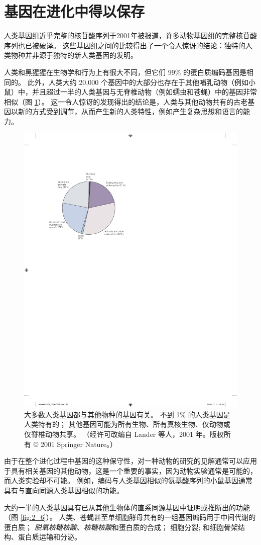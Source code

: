 \section{基因在进化中得以保存}

人类基因组近乎完整的核苷酸序列于2001年被报道，许多动物基因组的完整核苷酸序列也已被破译。 
这些基因组之间的比较得出了一个令人惊讶的结论：独特的人类物种并非源于独特的新人类基因的发明。


人类和黑猩猩在生物学和行为上有很大不同，但它们 99\% 的蛋白质编码基因是相同的。 
此外，人类大约 20,000 个基因中的大部分也存在于其他哺乳动物（例如小鼠）中，并且超过一半的人类基因与无脊椎动物（例如蠕虫和苍蝇）中的基因非常相似（图 \ref{fig:2_5}）。 
这一令人惊讶的发现得出的结论是，人类与其他动物共有的古老基因以新的方式受到调节，从而产生新的人类特性，例如产生复杂思想和语言的能力。

\begin{figure}[htbp]
	\centering
	\includegraphics[width=0.5\linewidth]{chap02/fig_2_5}
	\caption{大多数人类基因都与其他物种的基因有关。
		不到 1\% 的人类基因是人类特有的； 其他基因可能为所有生物、所有真核生物、仅动物或仅脊椎动物共享。 
		（经许可改编自 Lander 等人，2001 年。版权所有 © 2001 Springer Nature。）}
	\label{fig:2_5}
\end{figure}

由于在整个进化过程中基因的这种保守性，对一种动物的研究的见解通常可以应用于具有相关基因的其他动物，这是一个重要的事实，因为动物实验通常是可能的，而人类实验却不可能。 
例如，编码与人类基因相似的氨基酸序列的小鼠基因通常具有与直向同源人类基因相似的功能。


大约一半的人类基因具有已从其他生物体的直系同源基因中证明或推断出的功能（图 \ref{fig:2_6}）。 
人类、苍蝇甚至单细胞酵母共有的一组基因编码用于中间代谢的蛋白质； 
\textit{脱氧核糖核酸}、\textit{核糖核酸}和蛋白质的合成； 
细胞分裂; 和细胞骨架结构、蛋白质运输和分泌。

